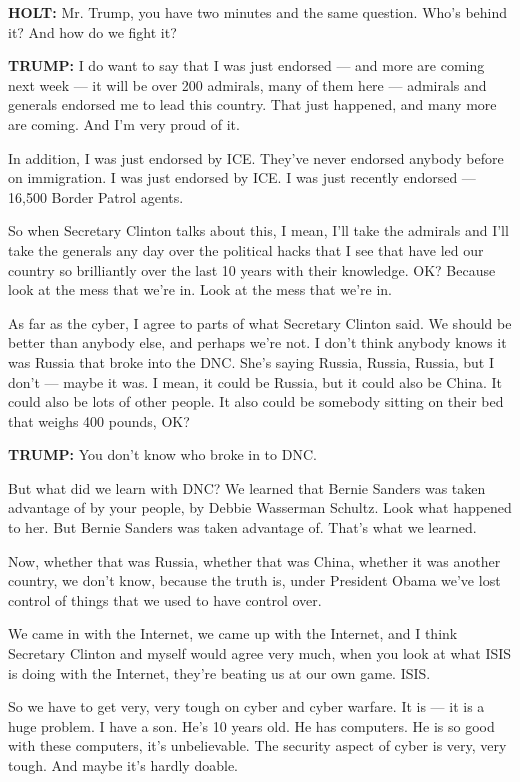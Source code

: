 \textbf{HOLT:} Mr. Trump, you have two minutes and the same question.
Who's behind it? And how do we fight it?

\textbf{TRUMP:} I do want to say that I was just endorsed --- and more
are coming next week --- it will be over 200 admirals, many of them here
--- admirals and generals endorsed me to lead this country. That just
happened, and many more are coming. And I'm very proud of it.

In addition, I was just endorsed by ICE. They've never endorsed anybody
before on immigration. I was just endorsed by ICE. I was just recently
endorsed --- 16,500 Border Patrol agents.

So when Secretary Clinton talks about this, I mean, I'll take the
admirals and I'll take the generals any day over the political hacks
that I see that have led our country so brilliantly over the last 10
years with their knowledge. OK? Because look at the mess that we're in.
Look at the mess that we're in.

As far as the cyber, I agree to parts of what Secretary Clinton said. We
should be better than anybody else, and perhaps we're not. I don't think
anybody knows it was Russia that broke into the DNC. She's saying
Russia, Russia, Russia, but I don't --- maybe it was. I mean, it could
be Russia, but it could also be China. It could also be lots of other
people. It also could be somebody sitting on their bed that weighs 400
pounds, OK?

\textbf{TRUMP:} You don't know who broke in to DNC.

But what did we learn with DNC? We learned that Bernie Sanders was taken
advantage of by your people, by Debbie Wasserman Schultz. Look what
happened to her. But Bernie Sanders was taken advantage of. That's what
we learned.

Now, whether that was Russia, whether that was China, whether it was
another country, we don't know, because the truth is, under President
Obama we've lost control of things that we used to have control over.

We came in with the Internet, we came up with the Internet, and I think
Secretary Clinton and myself would agree very much, when you look at
what ISIS is doing with the Internet, they're beating us at our own
game. ISIS.

So we have to get very, very tough on cyber and cyber warfare. It is ---
it is a huge problem. I have a son. He's 10 years old. He has computers.
He is so good with these computers, it's unbelievable. The security
aspect of cyber is very, very tough. And maybe it's hardly doable.

